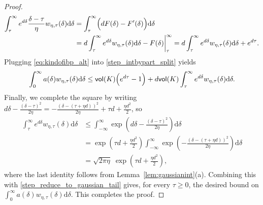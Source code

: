 \documentclass[10pt,a4paper]{amsart}
\newcommand{\D}{\mathrm{d}}
\newcommand{\vol}{\mathsf{vol}}
\begin{document}
\begin{proof}
\begin{align}
\int_\tau^\infty e^{d\delta}\frac{\delta-\tau}{\eta}w_{\eta,\tau}(\delta) \D\delta
&=
\int_\tau^\infty \Bigl(dF(\delta)-F'(\delta)\Bigr) \D\delta \nonumber\\
&=
d\int_\tau^\infty e^{d\delta}w_{\eta,\tau}(\delta) \D\delta
-F(\delta)\bigg|_{\tau}^{\infty}
=
d\int_\tau^\infty e^{d\delta}w_{\eta,\tau}(\delta) \D\delta
+e^{d\tau}.
\label{eq:kindofibp_alt}
\end{align}
Plugging \eqref{eq:kindofibp_alt} into \eqref{step_intbypart_split} yields
\begin{align}
\int_0^\infty a(\delta) w_{\eta,\tau}(\delta) \D\delta
\le
\vol(K)\Bigl(e^{d\tau}-1\Bigr)
+
d \vol(K)\int_\tau^\infty e^{d\delta}w_{\eta,\tau}(\delta) \D\delta.
\label{step_reduce_to_gaussian_tail}
\end{align}
Finally, we complete the square by writing $d\delta-\frac{(\delta-\tau)^2}{2\eta}
=
-\frac{\left(\delta-(\tau+\eta d)\right)^2}{2\eta}
+\tau d+\frac{\eta d^2}{2}$,
so
\begin{align}
\int_\tau^\infty e^{d\delta}w_{\eta,\tau}(\delta) \D\delta
&\le
\int_{-\infty}^{\infty}\exp\!\left(d\delta-\frac{(\delta-\tau)^2}{2\eta}\right) \D\delta \nonumber\\
&=
\exp\!\left(\tau d+\frac{\eta d^2}{2}\right)
\int_{-\infty}^{\infty}\exp\!\left(-\frac{\left(\delta-(\tau+\eta d)\right)^2}{2\eta}\right) \D\delta \nonumber\\
&=
\sqrt{2\pi\eta}\;
\exp\!\left(\tau d+\frac{\eta d^2}{2}\right),
\end{align}
where the last identity follows from Lemma~\ref{lem:gaussianint}(a).
Combining this with \eqref{step_reduce_to_gaussian_tail} gives, for every $\tau\ge 0$, the desired bound on $\int_0^\infty a(\delta) w_{\eta,\tau}(\delta) \D\delta$. This completes the proof.
\end{proof}
\end{document}
